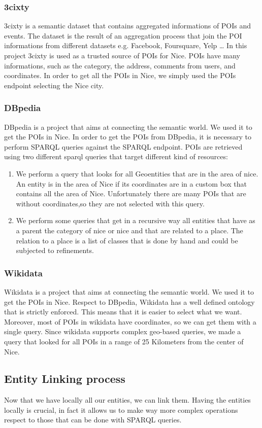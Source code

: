 \subsubsection{3cixty}
3cixty is a semantic dataset that contains aggregated informations of POIs and events. The dataset is the result of an aggregation process that join the POI informations from different datasets e.g. Facebook, Foursquare, Yelp \dots
In this project 3cixty is used as a trusted source of POIs for Nice.
POIs have many informations, such as the category, the address, comments from users, and coordinates. In order to get all the POIs in Nice, we simply used the POIs endpoint selecting the Nice city.
\subsubsection{DBpedia}
DBpedia is a project that aims at connecting the semantic world. We used it to get the POIs in Nice.
In order to get the POIs from DBpedia, it is necessary to perform SPARQL queries against the SPARQL endpoint. POIs are retrieved using two different sparql queries that target different kind of resources:
\begin{enumerate}
\item We perform a query that looks for all Geoentities that are in the area of nice. An entity is in the area of Nice if its coordinates are in a custom box that contains all the area of Nice.
Unfortunately there are many POIs that are without coordinates,so they are not selected with this query.
\item We perform some queries that get in a recursive way all entities that have as a parent the category of nice or nice and that are related to a place. The relation to a place is a list of classes that is done by hand and could be subjected to refinements.
\end{enumerate}
\subsubsection{Wikidata}
Wikidata is a project that aims at connecting the semantic world. We used it to get the POIs in Nice. Respect to DBpedia, Wikidata has a well defined ontology that is strictly enforced. This means that it is easier to select what we want. Moreover, most of POIs in wikidata have coordinates, so we can get them with a single query. Since wikidata supports complex geo-based queries, we made a query that looked for all POIs in a range of 25 Kilometers from the center of Nice.
\subsection{Entity Linking process}
Now that we have locally all our entities, we can link them. Having the entities locally is crucial, in fact it allows us to make way more complex operations respect to those that can be done with SPARQL queries.
